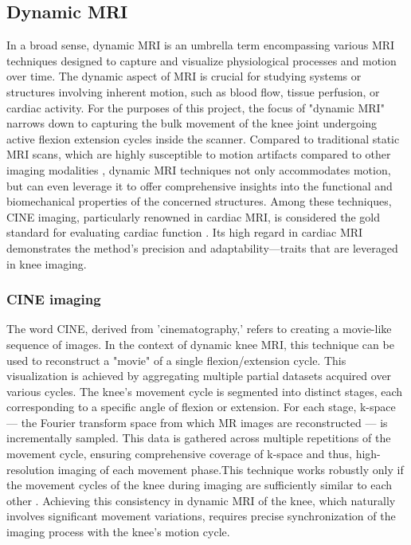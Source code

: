 \documentclass{micro-econ-thesis}
\begin{document}
\subsection{Dynamic MRI}
In a broad sense, dynamic MRI is an umbrella term encompassing various MRI techniques designed to capture and visualize physiological processes and motion over time. The dynamic aspect of MRI is crucial for studying systems or structures involving inherent motion, such as blood flow, tissue perfusion, or cardiac activity. For the purposes of this project, the focus of "dynamic MRI" narrows down to capturing the bulk movement of the knee joint undergoing active flexion extension cycles inside the scanner. Compared to traditional static MRI scans, which are highly susceptible to motion artifacts compared to other imaging modalities \parencite{zaitsev_motion_2015}, dynamic MRI techniques not only accommodates motion, but can even leverage it to offer comprehensive insights into the functional and biomechanical properties of the concerned structures.  Among these techniques, CINE imaging, particularly renowned in cardiac MRI, is considered the gold standard for evaluating cardiac function \parencite{menchon-lara_reconstruction_2019}. Its high regard in cardiac MRI demonstrates the method's precision and adaptability—traits that are leveraged in knee imaging.

\subsubsection{CINE imaging}

The word CINE, derived from 'cinematography,' refers to creating a movie-like sequence of images. In the context of dynamic knee MRI, this technique can be used to reconstruct a "movie" of a single flexion/extension cycle. This visualization is achieved by aggregating multiple partial datasets acquired over various cycles. The knee's movement cycle is segmented into distinct stages, each corresponding to a specific angle of flexion or extension. For each stage, k-space — the Fourier transform space from which MR images are reconstructed — is incrementally sampled. This data is gathered across multiple repetitions of the movement cycle, ensuring comprehensive coverage of k-space and thus, high-resolution imaging of each movement phase.This technique works robustly only if the movement cycles of the knee during imaging are sufficiently similar to each other \parencite{curtis_primer_2022}. Achieving this consistency in dynamic MRI of the knee, which naturally involves significant movement variations, requires precise synchronization of the imaging process with the knee's motion cycle. 
\end{document}
